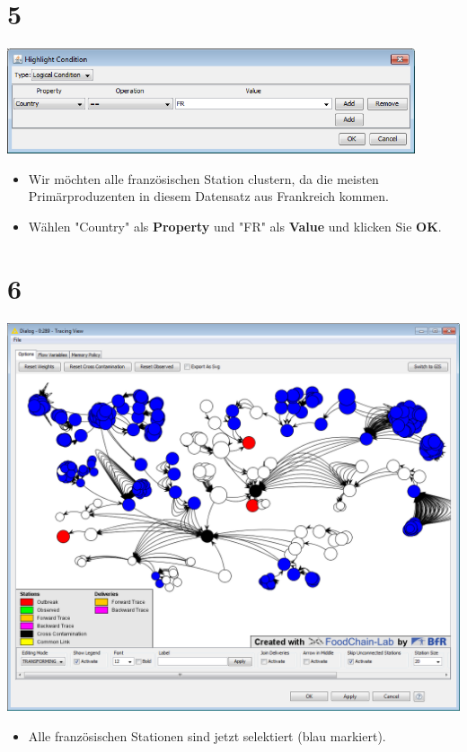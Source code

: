 \documentclass{beamer}
\begin{document}
\section{5}
\begin{frame}
	\begin{center}
  		\includegraphics[width=0.9\textwidth]{5.png}
	\end{center}
	\begin{itemize}
		\item Wir möchten alle französischen Station clustern, da die meisten Primärproduzenten in diesem Datensatz aus Frankreich kommen.
		\item Wählen "Country" als \textbf{Property} und "FR" als \textbf{Value} und klicken Sie \textbf{OK}.
	\end{itemize}
\end{frame}

\section{6}
\begin{frame}
	\begin{center}
  		\includegraphics[height=0.6\textheight]{6.png}
	\end{center}
	\begin{itemize}
		\item Alle französischen Stationen sind jetzt selektiert (blau markiert).
	\end{itemize}
\end{frame}
\end{document}
